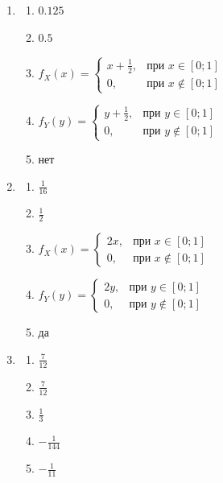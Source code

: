 \begin{enumerate}
\item
\begin{enumerate}
\item $0.125   $
\item $0.5 $
\item $f_{X}(x) = \begin{cases} x+\frac{1}{2}, & \text{при } x \in [0;1] \\ 0 , & \text{при } x \not\in [0;1] \end{cases}$
\item $f_{Y}(y) = \begin{cases} y+\frac{1}{2}, & \text{при } y \in [0;1] \\ 0 , & \text{при } y \not\in [0;1] \end{cases}$
\item нет
\end{enumerate}

\item
\begin{enumerate}
\item $\frac{1}{16}$

\item $\frac{1}{2}$

\item$f_{X}(x) = \begin{cases} 2x, & \text{при } x \in [0;1] \\ 0 , & \text{при } x \not\in [0;1] \end{cases}$

\item$f_{Y}(y) = \begin{cases} 2y, & \text{при } y \in [0;1] \\ 0 , & \text{при } y \not\in [0;1] \end{cases}$

\item да
\end{enumerate}

\item
\begin{enumerate}
\item $\frac{7}{12}$

\item $\frac{7}{12}$

\item $\frac{1}{3}$

\item $-\frac{1}{144}$

\item $-\frac{1}{11}$
\end{enumerate}


\end{enumerate}
